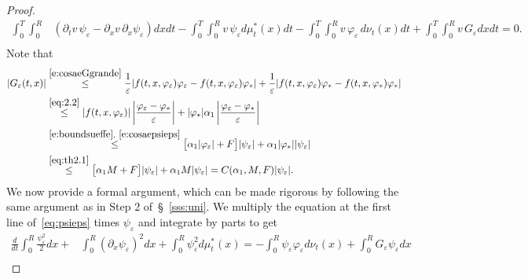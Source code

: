 \documentclass[11pt,leqno]{amsart}
\numberwithin{equation}{section}
\begin{document}
\begin{proof}
\begin{equation}
    \begin{split}
\int_0^T \! \! \int_0^R 
&
 \left({\partial_t} v \,  \psi_{\varepsilon} -{\partial_x } v\, {\partial_x } \psi_{\varepsilon}
  \right) dx dt-\int_0^T\! \! \int_0^R v \,\psi_{\varepsilon} d \mu^*_t (x) dt 
- \int_0^T \! \! \int_0^R v  \, {\varphi}_{\varepsilon}  \, d \nu_t(x) dt+
\int_0^T \! \! \int_0^R v \, G_{\varepsilon}   dx dt =0. \\
\end{split}
\end{equation}
Note that 
\begin{equation}
\label{e:boundsuGgrande}
\begin{split}
  | G_{\varepsilon}(t,x)| & 
  \stackrel{\eqref{e:cosaeGgrande}}{\leq}
  \frac{1}{\varepsilon}
  |f (t, x, {\varphi}_{\varepsilon} ) {\varphi}_{\varepsilon} -
f (t, x, {\varphi}_{\varepsilon} ) {\varphi}_\ast | + 
  \frac{1}{\varepsilon} 
   |f (t, x, {\varphi}_{\varepsilon} ) {\varphi}_\ast -
f (t, x, {\varphi}_\ast ) {\varphi}_\ast | \\
   & \stackrel{\eqref{eq:2.2}}{\leq}
   | f (t, x, {\varphi}_{\varepsilon} )|
   \left| \frac{{\varphi}_{\varepsilon} - {\varphi}_\ast}{\varepsilon}  \right|
   + |{\varphi}_\ast| \alpha_1 
   \left| \frac{{\varphi}_{\varepsilon} - {\varphi}_\ast}{\varepsilon}  \right| \\
   &  \stackrel{\eqref{e:boundsueffe},~\eqref{e:cosaepsieps}}{\leq}
   \big[ \alpha_1 |{\varphi}_{\varepsilon}| + F \big]
   |\psi_{\varepsilon}| + \alpha_1 |{\varphi}_\ast| |\psi_{\varepsilon}| \\
   & \stackrel{\eqref{eq:th2.1}}{\leq}
   \big[ \alpha_1M + F \big]
     |\psi_{\varepsilon}|+ \alpha_1 M  |\psi_{\varepsilon}| = C(\alpha_1, M, F)  |\psi_{\varepsilon}|.  
\end{split}
\end{equation}
We now provide a formal argument, which can be made rigorous by following the same argument as in {\sc Step 2} of~\S~\ref{sss:uni}. 
We multiply the equation at the first line of~\eqref{eq:psieps} times $\psi_{\varepsilon}$ and integrate by parts to get 
\begin{equation}
\label{e:chainmadrid}
\begin{split}
    \frac{d}{dt} 
    \int_0^R \frac{\psi_{\varepsilon}^2}{2} dx + &
    \int_0^R ({\partial_x } \psi_{\varepsilon})^2 dx +
    \int_0^R \psi^2_{\varepsilon} d \mu_t^* (x) = 
    - \int_0^R \psi_{\varepsilon} {\varphi}_{\varepsilon}  d \nu_t (x)
    + \int_0^R G_{\varepsilon} \psi_{\varepsilon}  dx \\

\end{split}
\end{equation}
\end{proof}
\end{document}
